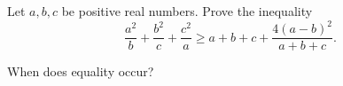 Let $a,b,c$ be positive real numbers. Prove the inequality\[\frac{a^2}{b}+\frac{b^2}{c}+\frac{c^2}{a}\geq a+b+c+\frac{4(a-b)^2}{a+b+c}.\]

When does equality occur?